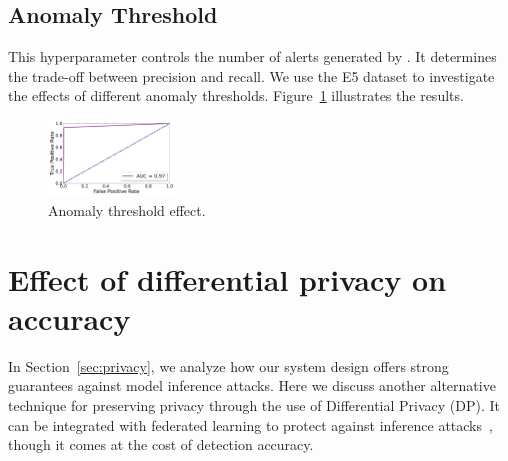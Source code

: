 
\subsection*{Anomaly Threshold}
\label{app:threshold}

This hyperparameter controls the number of alerts generated by \Sys. It determines the trade-off between precision and recall. We use the E5 dataset to investigate the effects of different anomaly thresholds. Figure~\ref{thresh} illustrates the results.

\begin{figure}[!t]
  \centering
  \includegraphics[width=0.3\textwidth]{fig/thresh.pdf}
  \caption{Anomaly threshold effect.}
  \label{thresh}
  \vspace{-2ex}
\end{figure}

\section{Effect of differential privacy on accuracy}
\label{app:dp}

In Section~\ref{sec:privacy}, we analyze how our system design offers strong guarantees against model inference attacks. Here we discuss another alternative technique for preserving privacy through the use of Differential Privacy (DP). It can be integrated with federated learning to protect against inference attacks~\cite{lyu2020threats,nasr2019comprehensive,zari2021efficient}, though it comes at the cost of detection accuracy. 

